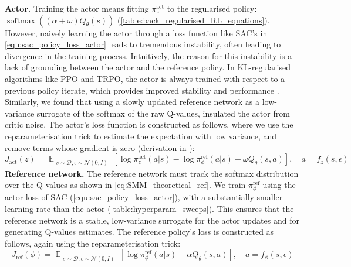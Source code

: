 \documentclass{article} %
\DeclareMathOperator*{\E}{\mathbb{E}}
\newcommand\expectwrt[2]{\E_{#2}\left[ #1 \right]}
\begin{document}
    \textbf{Actor.}
    Training the actor means fitting $\pi^\text{act}_z$ to the regularised policy: $\operatorname{softmax}((\alpha+\omega) Q_\theta(s))$ (\autoref{table:back_regularised_RL_equations}). However, naively learning the actor through a loss function like SAC's in \autoref{equ:sac_policy_loss_actor} leads to tremendous instability, often leading to divergence in the training process. Intuitively, the reason for this instability is a lack of grounding between the actor and the reference policy. In KL-regularised algorithms like PPO and TRPO, the actor is always trained with respect to a previous policy iterate, which provides improved stability and performance \citep{schulman2015trust, schulman2017proximal_PPO}.
    Similarly, we found that using a slowly updated reference network as a low-variance surrogate of the softmax of the raw Q-values, insulated the actor from critic noise.
    The actor's loss function is constructed as follows, where we use the reparameterisation trick \citep{kingma2013auto} to estimate the expectation with low variance, and remove terms whose gradient is zero (derivation in ):
    \begin{equation}
    \label{eq:SMM_policy_loss}
        J_\text{act}(z) = \expectwrt{\log\pi^\text{act}_z(a | s) - \log\pi^\text{ref}_\phi(a | s) - \omega Q_\theta(s, a) }{\substack{s \sim \mathcal{D}, \epsilon \sim \mathcal{N}(0, I)}}, \quad a = f_z(s, \epsilon)
    \end{equation}
    \textbf{Reference network.}
    The reference network must track the softmax distribution over the Q-values as shown in \autoref{eq:SMM_theoretical_ref}. We train $\pi^\text{ref}_\phi$ using the actor loss of SAC (\autoref{equ:sac_policy_loss_actor}), with a substantially smaller learning rate than the actor (\autoref{table:hyperparam_sweeps}). This ensures that the reference network is a stable, low-variance surrogate for the actor updates and for generating Q-values estimates. The reference policy's loss is constructed as follows, again using the reparameterisation trick:
    \begin{equation}
    \label{eq:SMM_ref_policy_loss}
    J_\text{ref}(\phi) = \expectwrt{\log\pi^\text{ref}_\phi(a | s) - \alpha Q_\theta(s, a) }{\substack{s \sim \mathcal{D}, \epsilon \sim \mathcal{N}(0, I)}}, \quad a = f_\phi(s, \epsilon)
    \end{equation}
\end{document}
